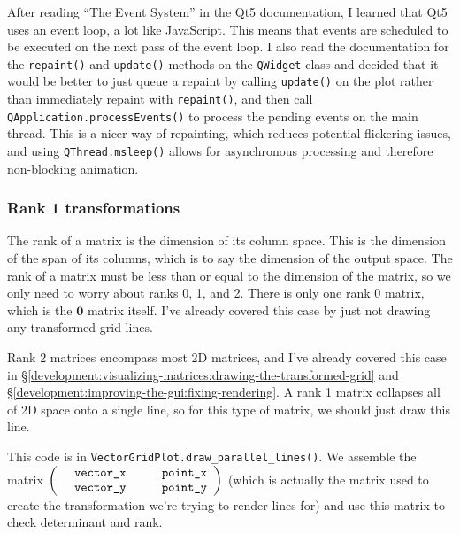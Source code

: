 \documentclass[../development.tex]{subfiles}
\begin{document}
After reading \enquote{The Event System} in the Qt5 documentation\cite{qt5-docs-event-system}, I learned that Qt5 uses an event loop, a lot like JavaScript. This means that events are scheduled to be executed on the next pass of the event loop. I also read the documentation for the \texttt{repaint()} and \texttt{update()} methods on the \texttt{QWidget} class\cite{qt5-docs-qwidget-repaint,qt5-docs-qwidget-update} and decided that it would be better to just queue a repaint by calling \texttt{update()} on the plot rather than immediately repaint with \texttt{repaint()}, and then call \texttt{QApplication.processEvents()} to process the pending events on the main thread. This is a nicer way of repainting, which reduces potential flickering issues, and using \texttt{QThread.msleep()} allows for asynchronous processing and therefore non-blocking animation.

\subsubsection{Rank 1 transformations\label{development:improving-the-gui:rank-1-transformations}}

The rank of a matrix is the dimension of its column space. This is the dimension of the span of its columns, which is to say the dimension of the output space. The rank of a matrix must be less than or equal to the dimension of the matrix, so we only need to worry about ranks 0, 1, and 2. There is only one rank 0 matrix, which is the $\mathbf{0}$ matrix itself. I've already covered this case by just not drawing any transformed grid lines.

Rank 2 matrices encompass most 2D matrices, and I've already covered this case in \S\ref{development:visualizing-matrices:drawing-the-transformed-grid} and \S\ref{development:improving-the-gui:fixing-rendering}. A rank 1 matrix collapses all of 2D space onto a single line, so for this type of matrix, we should just draw this line.

This code is in \texttt{VectorGridPlot.draw\_parallel\_lines()}. We assemble the matrix $\begin{pmatrix}\text{\texttt{vector\_x}} & \text{\texttt{point\_x}}\\ \text{\texttt{vector\_y}} & \text{\texttt{point\_y}}\end{pmatrix}$ (which is actually the matrix used to create the transformation we're trying to render lines for) and use this matrix to check determinant and rank.

\end{document}
